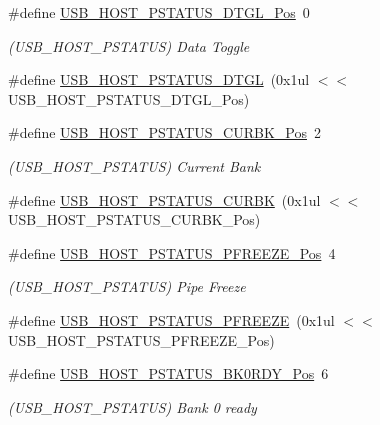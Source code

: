 \begin{DoxyCompactItemize}
\#define \mbox{\hyperlink{group___s_a_m_d21___u_s_b_ga8eadae650b89d48c3107ffe677762a31}{U\+S\+B\+\_\+\+H\+O\+S\+T\+\_\+\+P\+S\+T\+A\+T\+U\+S\+\_\+\+D\+T\+G\+L\+\_\+\+Pos}}~0
\begin{DoxyCompactList}\small\item\em (U\+S\+B\+\_\+\+H\+O\+S\+T\+\_\+\+P\+S\+T\+A\+T\+US) Data Toggle \end{DoxyCompactList}\item 
\#define \mbox{\hyperlink{group___s_a_m_d21___u_s_b_ga14cb5c3d045e42137ce317a211e33f39}{U\+S\+B\+\_\+\+H\+O\+S\+T\+\_\+\+P\+S\+T\+A\+T\+U\+S\+\_\+\+D\+T\+GL}}~(0x1ul $<$$<$ U\+S\+B\+\_\+\+H\+O\+S\+T\+\_\+\+P\+S\+T\+A\+T\+U\+S\+\_\+\+D\+T\+G\+L\+\_\+\+Pos)
\item 
\#define \mbox{\hyperlink{group___s_a_m_d21___u_s_b_ga08a0b4f63249f700520bd18d25ed92ae}{U\+S\+B\+\_\+\+H\+O\+S\+T\+\_\+\+P\+S\+T\+A\+T\+U\+S\+\_\+\+C\+U\+R\+B\+K\+\_\+\+Pos}}~2
\begin{DoxyCompactList}\small\item\em (U\+S\+B\+\_\+\+H\+O\+S\+T\+\_\+\+P\+S\+T\+A\+T\+US) Current Bank \end{DoxyCompactList}\item 
\#define \mbox{\hyperlink{group___s_a_m_d21___u_s_b_ga5e556065803b13ca5bbbb0d3b92f295f}{U\+S\+B\+\_\+\+H\+O\+S\+T\+\_\+\+P\+S\+T\+A\+T\+U\+S\+\_\+\+C\+U\+R\+BK}}~(0x1ul $<$$<$ U\+S\+B\+\_\+\+H\+O\+S\+T\+\_\+\+P\+S\+T\+A\+T\+U\+S\+\_\+\+C\+U\+R\+B\+K\+\_\+\+Pos)
\item 
\#define \mbox{\hyperlink{group___s_a_m_d21___u_s_b_ga79e25a4f4de62e5cc7983e573b20bf0d}{U\+S\+B\+\_\+\+H\+O\+S\+T\+\_\+\+P\+S\+T\+A\+T\+U\+S\+\_\+\+P\+F\+R\+E\+E\+Z\+E\+\_\+\+Pos}}~4
\begin{DoxyCompactList}\small\item\em (U\+S\+B\+\_\+\+H\+O\+S\+T\+\_\+\+P\+S\+T\+A\+T\+US) Pipe Freeze \end{DoxyCompactList}\item 
\#define \mbox{\hyperlink{group___s_a_m_d21___u_s_b_ga145f14dad881138c0f363ed4640e1020}{U\+S\+B\+\_\+\+H\+O\+S\+T\+\_\+\+P\+S\+T\+A\+T\+U\+S\+\_\+\+P\+F\+R\+E\+E\+ZE}}~(0x1ul $<$$<$ U\+S\+B\+\_\+\+H\+O\+S\+T\+\_\+\+P\+S\+T\+A\+T\+U\+S\+\_\+\+P\+F\+R\+E\+E\+Z\+E\+\_\+\+Pos)
\item 
\#define \mbox{\hyperlink{group___s_a_m_d21___u_s_b_gaa6ea40a00ce6778d123408464b75fbaa}{U\+S\+B\+\_\+\+H\+O\+S\+T\+\_\+\+P\+S\+T\+A\+T\+U\+S\+\_\+\+B\+K0\+R\+D\+Y\+\_\+\+Pos}}~6
\begin{DoxyCompactList}\small\item\em (U\+S\+B\+\_\+\+H\+O\+S\+T\+\_\+\+P\+S\+T\+A\+T\+US) Bank 0 ready \end{DoxyCompactList}\item 
$$
\end{DoxyCompactItemize}
